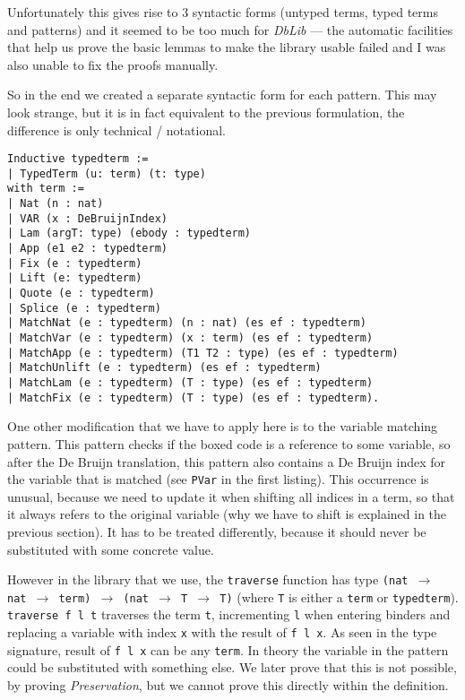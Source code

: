 \documentclass[runningheads]{article}
\begin{document}
Unfortunately this gives rise to 3 syntactic forms (untyped terms, typed terms and patterns) and it seemed to be too much for \textit{DbLib} --- the automatic facilities that help us prove the basic lemmas to make the library usable failed and I was also unable to fix the proofs manually.

So in the end we created a separate syntactic form for each pattern. This may look strange, but it is in fact equivalent to the previous formulation, the difference is only technical / notational.

\begin{verbatim}
Inductive typedterm :=
| TypedTerm (u: term) (t: type)
with term :=
| Nat (n : nat)
| VAR (x : DeBruijnIndex)
| Lam (argT: type) (ebody : typedterm)
| App (e1 e2 : typedterm)
| Fix (e : typedterm)
| Lift (e: typedterm)
| Quote (e : typedterm)
| Splice (e : typedterm)
| MatchNat (e : typedterm) (n : nat) (es ef : typedterm)
| MatchVar (e : typedterm) (x : term) (es ef : typedterm)
| MatchApp (e : typedterm) (T1 T2 : type) (es ef : typedterm)
| MatchUnlift (e : typedterm) (es ef : typedterm)
| MatchLam (e : typedterm) (T : type) (es ef : typedterm)
| MatchFix (e : typedterm) (T : type) (es ef : typedterm).
\end{verbatim}

One other modification that we have to apply here is to the variable matching pattern. This pattern checks if the boxed code is a reference to some variable, so after the De Bruijn translation, this pattern also contains a De Bruijn index for the variable that is matched (see \texttt{PVar} in the first listing). This occurrence is unusual, because we need to update it when shifting all indices in a term, so that it always refers to the original variable (why we have to shift is explained in the previous section). It has to be treated differently, because it should never be substituted with some concrete value.

However in the library that we use, the \texttt{traverse} function has type \texttt{(nat $\to$ nat $\to$ term) $\to$ (nat $\to$ T $\to$ T)} (where \texttt{T} is either a \texttt{term} or \texttt{typedterm}). \texttt{traverse f l t} traverses the term \texttt{t}, incrementing \texttt{l} when entering binders and replacing a variable with index \texttt{x} with the result of \texttt{f l x}. As seen in the type signature, result of \texttt{f l x} can be any \texttt{term}. In theory the variable in the pattern could be substituted with something else. We later prove that this is not possible, by proving \textit{Preservation}, but we cannot prove this directly within the definition.
\end{document}
